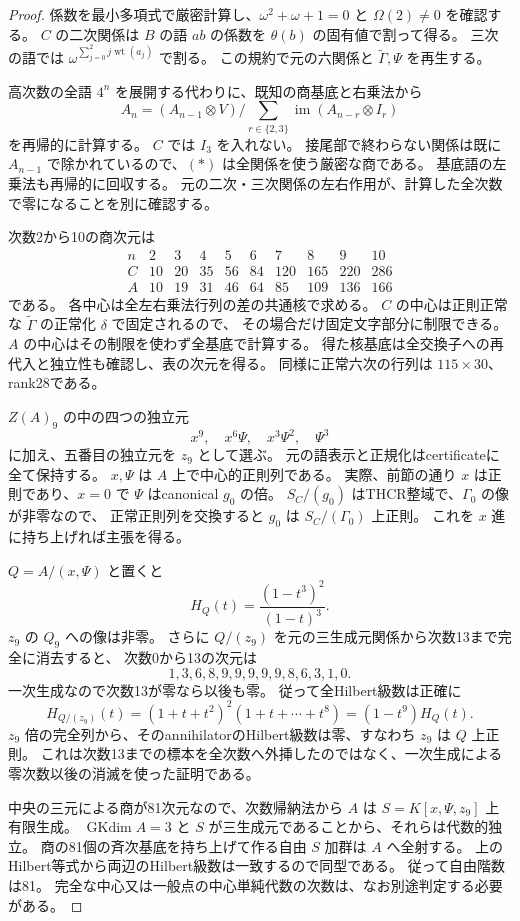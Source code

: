 \begin{proof}
係数を最小多項式で厳密計算し、$\omega^2+\omega+1=0$ と $\Omega(2)\ne0$ を確認する。
$C$ の二次関係は $B$ の語 $ab$ の係数を
$\theta(b)$ の固有値で割って得る。
三次の語では $\omega^{\sum_{j=0}^2j\operatorname{wt}(a_j)}$ で割る。
この規約で元の六関係と $\widetilde\Gamma,\Psi$ を再生する。

高次数の全語 $4^n$ を展開する代わりに、既知の商基底と右乗法から
\[
 A_n=(A_{n-1}\otimes V)\Big/
 \sum_{r\in\{2,3\}}\operatorname{im}(A_{n-r}\otimes I_r)
\tag{*}
\]
を再帰的に計算する。
$C$ では $I_3$ を入れない。
接尾部で終わらない関係は既に $A_{n-1}$ で除かれているので、$(*)$ は全関係を使う厳密な商である。
基底語の左乗法も再帰的に回収する。
元の二次・三次関係の左右作用が、計算した全次数で零になることを別に確認する。

次数2から10の商次元は
\[
\begin{array}{c|rrrrrrrrr}
n&2&3&4&5&6&7&8&9&10\\\hline
C&10&20&35&56&84&120&165&220&286\\
A&10&19&31&46&64&85&109&136&166
\end{array}
\]
である。
各中心は全左右乗法行列の差の共通核で求める。
$C$ の中心は正則正常な $\widetilde\Gamma$ の正常化 $\delta$ で固定されるので、
その場合だけ固定文字部分に制限できる。
$A$ の中心はその制限を使わず全基底で計算する。
得た核基底は全交換子への再代入と独立性も確認し、表の次元を得る。
同様に正常六次の行列は $115\times30$、rank28である。

$Z(A)_9$ の中の四つの独立元
\[
 x^9,\quad x^6\Psi,\quad x^3\Psi^2,\quad\Psi^3
\]
に加え、五番目の独立元を $z_9$ として選ぶ。
元の語表示と正規化はcertificateに全て保持する。
$x,\Psi$ は $A$ 上で中心的正則列である。
実際、前節の通り $x$ は正則であり、$x=0$ で $\Psi$ はcanonical $g_0$ の倍。
$S_C/(g_0)$ はTHCR整域で、$\Gamma_0$ の像が非零なので、
正常正則列を交換すると $g_0$ は $S_C/(\Gamma_0)$ 上正則。
これを $x$ 進に持ち上げれば主張を得る。

$Q=A/(x,\Psi)$ と置くと
\[
 H_Q(t)=\frac{(1-t^3)^2}{(1-t)^3}.
\]
$z_9$ の $Q_9$ への像は非零。
さらに $Q/(z_9)$ を元の三生成元関係から次数13まで完全に消去すると、
次数0から13の次元は
\[
 1,3,6,8,9,9,9,9,9,8,6,3,1,0.
\]
一次生成なので次数13が零なら以後も零。
従って全Hilbert級数は正確に
\[
 H_{Q/(z_9)}(t)=(1+t+t^2)^2(1+t+\cdots+t^8)
              =(1-t^9)H_Q(t).
\]
$z_9$ 倍の完全列から、そのannihilatorのHilbert級数は零、すなわち $z_9$ は $Q$ 上正則。
これは次数13までの標本を全次数へ外挿したのではなく、一次生成による零次数以後の消滅を使った証明である。

中央の三元による商が81次元なので、次数帰納法から $A$ は
$S=K[x,\Psi,z_9]$ 上有限生成。
$\operatorname{GKdim} A=3$ と $S$ が三生成元であることから、それらは代数的独立。
商の81個の斉次基底を持ち上げて作る自由 $S$ 加群は $A$ へ全射する。
上のHilbert等式から両辺のHilbert級数は一致するので同型である。
従って自由階数は81。
完全な中心又は一般点の中心単純代数の次数は、なお別途判定する必要がある。
\end{proof}
